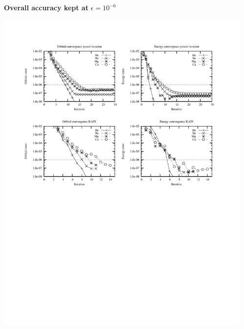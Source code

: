 \begin{frame}
\begin{columns}
\begin{column}[b]{0.4\textwidth}
    \end{column}
    \begin{column}[b]{0.6\textwidth}
      \centering
      \small
      \textbf{Overall accuracy kept at} $\epsilon = 10^{-6}$
      \begin{center}
	    \includegraphics[scale=0.8, clip, viewport = 50 550 300 740]{figures/accuracy.pdf}
      \end{center}
      \vspace{10mm}
    \end{column}
  \end{columns}
\end{frame}

